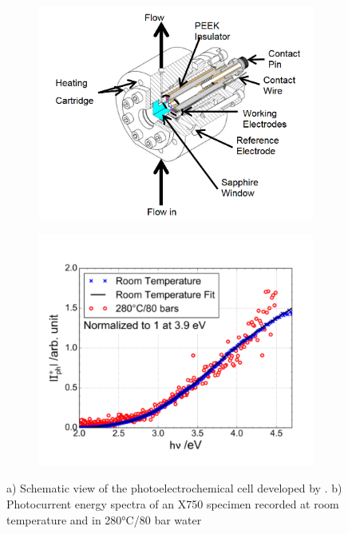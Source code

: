     \renewcommand{\coef}{0.45}
    \begin{figure}[h]
        \centering
        \begin{subfigure}{\coef\textwidth}
            \centering
            \includegraphics[width=\textwidth]{./src/figures/skocic2015-1.png}
            \caption{}
            \label{fig_skocic_phd_cell}
        \end{subfigure}
        \begin{subfigure}{\coef\textwidth}
            \centering
            \includegraphics[width=\textwidth]{./src/figures/skocic2015-2.png}
            \caption{}
            \label{fig_skocic_phd_htpec}
        \end{subfigure}
        
        \caption{a) Schematic view of the photoelectrochemical cell developed by \citet{skocic2016}. 
        b) Photocurrent energy spectra of an X750 specimen recorded at room
        temperature and in 280°C/80 bar water \citep{skocic2016}}
        \label{fig_skocic_phd}
    \end{figure}
